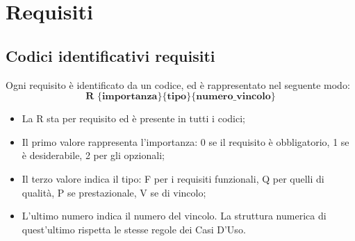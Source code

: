 \section{Requisiti}
\subsection{Codici identificativi requisiti} \label{cod_requisiti}
Ogni requisito è identificato da un codice, ed è rappresentato nel seguente modo:
$$ \textbf{R \{importanza\}\{tipo\}\{numero\_vincolo\} } $$

\begin{itemize}
	\item La R sta per requisito ed è presente in tutti i codici;
	\item Il primo valore rappresenta l'importanza: 0 se il requisito è obbligatorio, 1 se è desiderabile, 2 per gli opzionali;
	\item Il terzo valore indica il tipo: F per i requisiti funzionali, Q per quelli di qualità, P se prestazionale, V se di vincolo;
	\item L'ultimo numero indica il numero del vincolo. La struttura numerica di quest'ultimo rispetta le stesse regole dei Casi D'Uso.
\end{itemize}


\label{funzionali}

